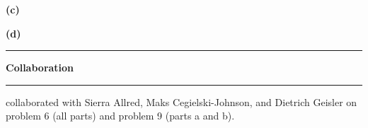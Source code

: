 \documentclass[11pt]{article}
\newcommand\question[2]{\vspace{.25in}\hrule\textbf{#1}\vspace{.5em}\hrule\vspace{.10in}}
\renewcommand\part[1]{\vspace{.10in}\textbf{(#1)}}
\begin{document}

\part{c}  


\part{d} 


\newpage

\question{Collaboration}

I collaborated with Sierra Allred, Maks Cegielski-Johnson, and Dietrich Geisler on problem 6 (all parts) and problem 9 (parts a and b).
\end{document}
